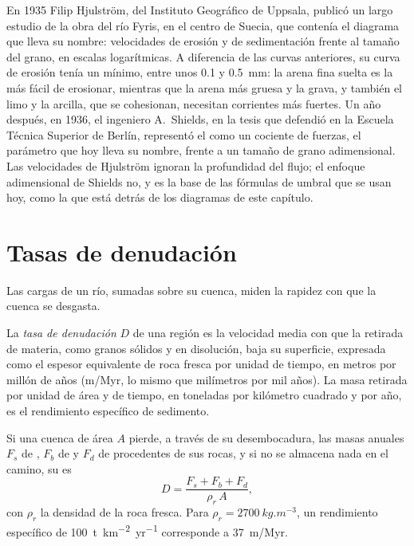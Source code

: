 \begin{history}
En 1935 Filip Hjulström, del Instituto Geográfico de Uppsala, publicó un largo estudio de la obra del río Fyris, en el centro de Suecia, que contenía
el diagrama que lleva su nombre: velocidades de erosión y de sedimentación frente al tamaño del grano, en escalas logarítmicas. A diferencia de las
curvas anteriores, su curva de erosión tenía un mínimo, entre unos \num{0.1} y \qty{0.5}{mm}: la arena fina suelta es la más fácil de erosionar, mientras
que la arena más gruesa y la grava, y también el limo y la arcilla, que se cohesionan, necesitan corrientes más fuertes. Un año después, en 1936, el ingeniero
A.~Shields, en la tesis que defendió en la Escuela Técnica Superior de Berlín, representó el  como un cociente de fuerzas, el parámetro que
hoy lleva su nombre, frente a un tamaño de grano adimensional. Las velocidades de Hjulström ignoran la profundidad del flujo; el enfoque adimensional de Shields
no, y es la base de las fórmulas de umbral que se usan hoy, como la que está detrás de los diagramas de este capítulo.
\end{history}

\section{Tasas de denudación}\label{sec:b1:erosion-transport:denudation}

Las cargas de un río, sumadas sobre su cuenca, miden la rapidez con que la cuenca se desgasta.

\begin{definition}\label{def:b1:erosion-transport:denudation}
La \emph{tasa de denudación} $D$ de una región es la velocidad media con que la retirada de materia, como granos sólidos y en
disolución, baja su superficie, expresada como el espesor equivalente de roca fresca por unidad de tiempo, en metros por millón de años (\unit{m/Myr}, lo mismo que
milímetros por mil años). La masa retirada por unidad de área y de tiempo, en toneladas por kilómetro cuadrado y por año, es el rendimiento específico de sedimento.
\end{definition}

\begin{proposition}\label{prop:b1:erosion-transport:denudation}
Si una cuenca de área $A$ pierde, a través de su desembocadura, las masas anuales $F_s$ de , $F_b$ de  y $F_d$ de  procedentes de sus rocas, y si no se almacena nada en el camino, su  es
\[
  D = \frac{F_s + F_b + F_d}{\rho_r\,A},
\]
con $\rho_r$ la densidad de la roca fresca. Para $\rho_r =
\qty{2700}{kg.m^{-3}}$, un rendimiento específico de \qty{100}{t.km^{-2}.yr^{-1}} corresponde a \qty{37}{m/Myr}.
\end{proposition}

